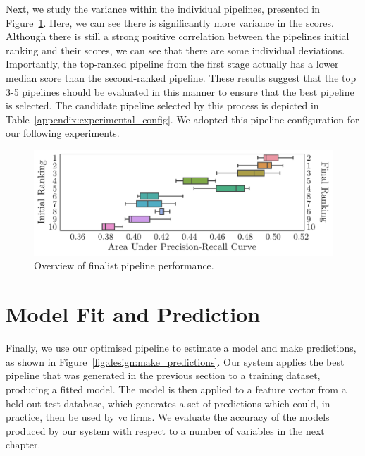 \documentclass[../thesis/thesis.tex]{subfiles}
\begin{document}
Next, we study the variance within the individual pipelines, presented in Figure~\ref{fig:design:selection_agg_rank}. Here, we can see there is significantly more variance in the scores. Although there is still a strong positive correlation between the pipelines initial ranking and their scores, we can see that there are some individual deviations. Importantly, the top-ranked pipeline from the first stage actually has a lower median score than the second-ranked pipeline. These results suggest that the top 3-5 pipelines should be evaluated in this manner to ensure that the best pipeline is selected. The candidate pipeline selected by this process is depicted in Table~\ref{appendix:experimental_config}. We adopted this pipeline configuration for our following experiments.

\begin{figure}[!htb]
    \centering
    \includegraphics[width=\textwidth]{../figures/design/auc_finalists_rank}
    \caption[Overview of finalist pipeline performance]{Overview of finalist pipeline performance.}
    \label{fig:design:selection_agg_rank}
\end{figure}

\section{Model Fit and Prediction}

Finally, we use our optimised pipeline to estimate a model and make predictions, as shown in Figure~\ref{fig:design:make_predictions}. Our system applies the best pipeline that was generated in the previous section to a training dataset, producing a fitted model. The model is then applied to a feature vector from a held-out test database, which generates a set of predictions which could, in practice, then be used by \gls{vc} firms. We evaluate the accuracy of the models produced by our system with respect to a number of variables in the next chapter.
\end{document}
